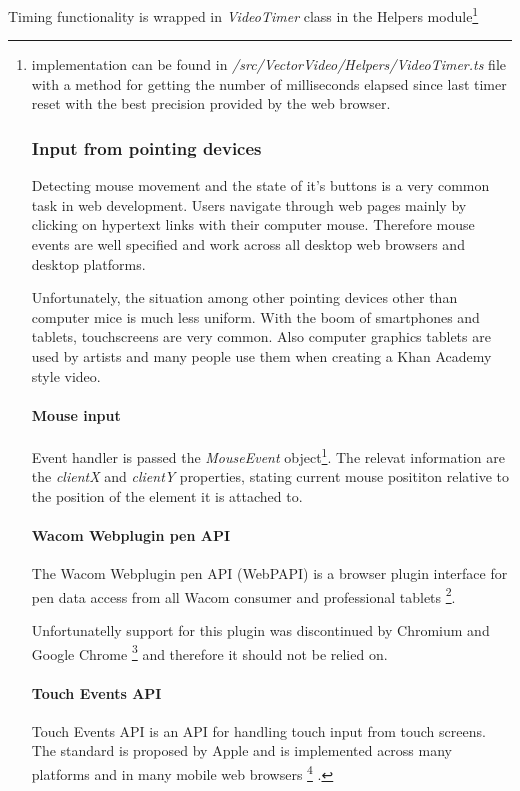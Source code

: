Timing functionality is wrapped in \textit{VideoTimer} class in the Helpers module\footnote{implementation can be found in \textit{/src/VectorVideo/Helpers/VideoTimer.ts} file with a method for getting the number of milliseconds elapsed since last timer reset with the best precision provided by the web browser.



\subsubsection{Input from pointing devices}

Detecting mouse movement and the state of it's buttons is a very common task in web development. Users navigate through web pages mainly by clicking on hypertext links with their computer mouse. Therefore mouse events are well specified and work across all desktop web browsers and desktop platforms.

Unfortunately, the situation among other pointing devices other than computer mice is much less uniform. With the boom of smartphones and tablets, touchscreens are very common. Also computer graphics tablets are used by artists and many people use them when creating a Khan Academy style video.

\paragraph{Mouse input}
Event handler is passed the \textit{MouseEvent} object\footnote{http://www.w3.org/TR/DOM-Level-2-Events/events.html#Events-MouseEvent}. The relevat information are the \textit{clientX} and \textit{clientY} properties, stating current mouse posititon relative to the position of the element it is attached to. 

\paragraph{Wacom Webplugin pen API}
The Wacom Webplugin pen API (WebPAPI) is a browser plugin interface for pen data access from all Wacom consumer and professional tablets \cite{}\footnote{http://www.wacomeng.com/web/WebPluginReleaseNotes.htm}.

Unfortunatelly support for this plugin was discontinued by Chromium and Google Chrome \footnote{http://blog.chromium.org/2013/09/saying-goodbye-to-our-old-friend-npapi.htm} and therefore it should not be relied on.

\paragraph{Touch Events API}
Touch Events API is an API for handling touch input from touch screens. The standard is proposed by Apple and is implemented across many platforms and in many mobile web browsers \footnote{http://caniuse.com/\#feat=touch} \cite{}.

}
